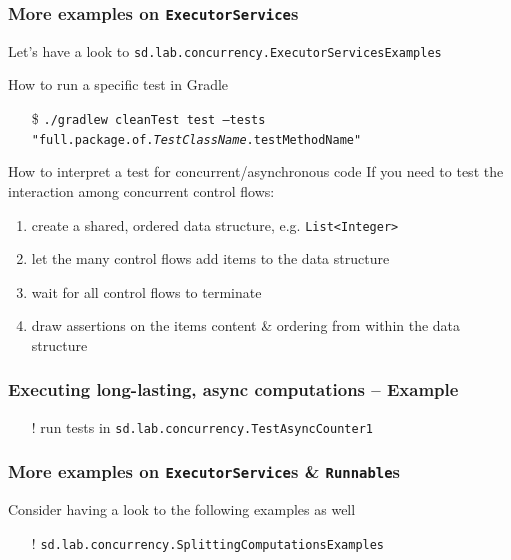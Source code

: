 \documentclass{beamer}\mode<presentation>{\usetheme{AMSCesenaPurpleAndGold}}
\begin{document}
\begin{frame}%
\frametitle{More examples on \texttt{ExecutorService}s}

	Let's have a look to \texttt{sd.lab.concurrency.\alert{ExecutorServicesExamples}}
	
	\vfill
	
	\begin{block}{How to run a specific test in Gradle}
		\begin{itemize}
			\item[\$] \texttt{./gradlew cleanTest test --tests "full.package.of.\textit{TestClassName}.\alert{testMethodName}"}
		\end{itemize}
	\end{block}
	
	\vfill
	
	\begin{block}{How to interpret a test for concurrent/asynchronous code}
		If you need to test the interaction among \alert{concurrent} control flows:
		\begin{enumerate}
			\item create a shared, ordered data structure, e.g. \texttt{List<\alert{Integer}>}
			
			\item let the many control flows add items to the data structure
			
			\item wait for all control flows to terminate
			
			\item draw assertions on the items content \& ordering from within the data structure
		\end{enumerate}
	\end{block}

\end{frame}

\begin{frame}%
\frametitle{Executing long-lasting, async computations -- Example}

	
	
	\begin{itemize}
		\item[!] run tests in \texttt{sd.lab.concurrency.\alert{TestAsyncCounter1}}
	\end{itemize}

\end{frame}

\begin{frame}[c]
\frametitle{More examples on \texttt{ExecutorService}s \& \texttt{Runnable}s}

	Consider having a look to the following examples as well
	\begin{itemize}
		\item[!] \texttt{sd.lab.concurrency.\alert{SplittingComputationsExamples}}
	\end{itemize}

\end{frame}
\end{document}
